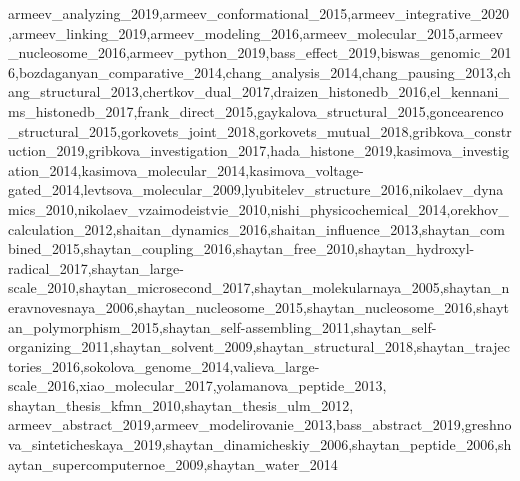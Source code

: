 {{          armeev_analyzing_2019,armeev_conformational_2015,armeev_integrative_2020,armeev_linking_2019,armeev_modeling_2016,armeev_molecular_2015,armeev_nucleosome_2016,armeev_python_2019,bass_effect_2019,biswas_genomic_2016,bozdaganyan_comparative_2014,chang_analysis_2014,chang_pausing_2013,chang_structural_2013,chertkov_dual_2017,draizen_histonedb_2016,el_kennani_ms_histonedb_2017,frank_direct_2015,gaykalova_structural_2015,goncearenco_structural_2015,gorkovets_joint_2018,gorkovets_mutual_2018,gribkova_construction_2019,gribkova_investigation_2017,hada_histone_2019,kasimova_investigation_2014,kasimova_molecular_2014,kasimova_voltage-gated_2014,levtsova_molecular_2009,lyubitelev_structure_2016,nikolaev_dynamics_2010,nikolaev_vzaimodeistvie_2010,nishi_physicochemical_2014,orekhov_calculation_2012,shaitan_dynamics_2016,shaitan_influence_2013,shaytan_combined_2015,shaytan_coupling_2016,shaytan_free_2010,shaytan_hydroxyl-radical_2017,shaytan_large-scale_2010,shaytan_microsecond_2017,shaytan_molekularnaya_2005,shaytan_neravnovesnaya_2006,shaytan_nucleosome_2015,shaytan_nucleosome_2016,shaytan_polymorphism_2015,shaytan_self-assembling_2011,shaytan_self-organizing_2011,shaytan_solvent_2009,shaytan_structural_2018,shaytan_trajectories_2016,sokolova_genome_2014,valieva_large-scale_2016,xiao_molecular_2017,yolamanova_peptide_2013,%
          shaytan_thesis_kfmn_2010,shaytan_thesis_ulm_2012,%
          armeev_abstract_2019,armeev_modelirovanie_2013,bass_abstract_2019,greshnova_sinteticheskaya_2019,shaytan_dinamicheskiy_2006,shaytan_peptide_2006,shaytan_supercomputernoe_2009,shaytan_water_2014}


}
